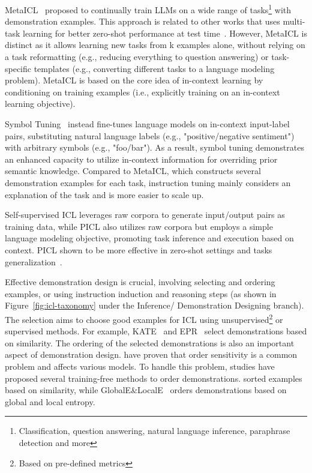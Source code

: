 MetaICL~\cite{min2022metaicl} proposed to continually train LLMs on a wide range of tasks\footnote{Classification, question answering,
	natural language inference, paraphrase detection and more} with demonstration examples.
This approach is related to other works that uses multi-task learning for better zero-shot performance at test time~\cite{min2022metaicl}.
However, MetaICL is distinct as it allows learning new tasks from k examples alone, without relying on a task reformatting (e.g., reducing everything to question answering)
or task-specific templates (e.g., converting different tasks to a language modeling problem).
MetaICL is based on the core idea of in-context learning by conditioning on training examples (i.e., explicitly training on an in-context learning objective).

Symbol Tuning~\cite{wei2023symbol} instead fine-tunes language models on in-context input-label pairs, substituting natural language labels (e.g., "positive/negative sentiment") with arbitrary symbols (e.g., "foo/bar").
As a result, symbol tuning demonstrates an enhanced capacity to utilize in-context information for overriding prior semantic knowledge.
Compared to MetaICL, which constructs several demonstration examples for each task, instruction tuning mainly considers an explanation of the task and is more easier to scale up.

Self-supervised ICL leverages raw corpora to generate input/output pairs as training data, while PICL also utilizes raw corpora but employs a simple language modeling objective, promoting task inference and execution based on context.
PICL shown to be more effective in zero-shot settings and tasks generalization~\cite{dong2023survey}.

Effective demonstration design is crucial, involving selecting and ordering examples, or using instruction induction and reasoning steps (as shown in Figure~\ref{fig:icl-taxonomy} under the Inference/ Demonstration Designing branch).
The selection aims to choose good examples for ICL using unsupervised\footnote{Based on pre-defined metrics} or supervised methods.
For example, KATE~\cite{liu2022good} and EPR~\cite{rubin2022learning} select demonstrations based on similarity.
The ordering of the selected demonstrations is also an important aspect of demonstration design.
\textcite{lu2022fantastically} have proven that order sensitivity is a common problem and affects various models.
To handle this problem, studies have proposed several training-free methods to order demonstrations.
\textcite{liu2022good} sorted examples based on similarity, while GlobalE\&LocalE~\cite{lu2022fantastically} orders demonstrations based on global and local entropy.


